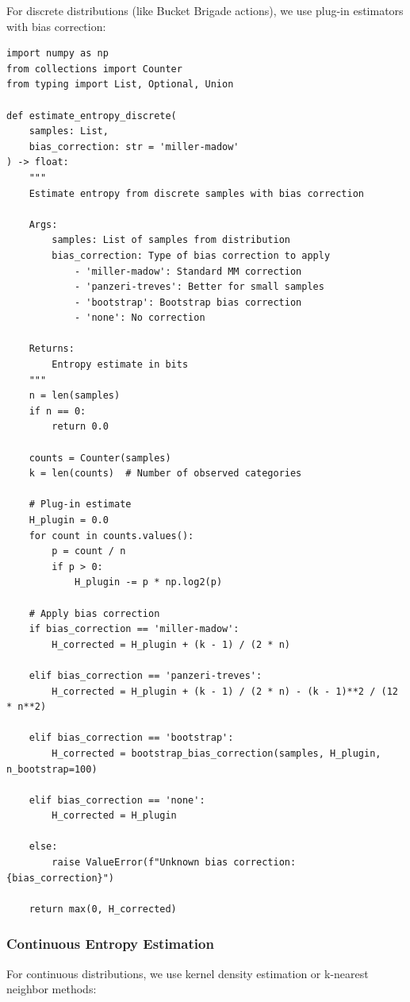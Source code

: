 \documentclass[10pt, letterpaper]{article}
\begin{document}
For discrete distributions (like Bucket Brigade actions), we use plug-in estimators with bias correction:

\begin{lstlisting}
import numpy as np
from collections import Counter
from typing import List, Optional, Union

def estimate_entropy_discrete(
    samples: List,
    bias_correction: str = 'miller-madow'
) -> float:
    """
    Estimate entropy from discrete samples with bias correction

    Args:
        samples: List of samples from distribution
        bias_correction: Type of bias correction to apply
            - 'miller-madow': Standard MM correction
            - 'panzeri-treves': Better for small samples
            - 'bootstrap': Bootstrap bias correction
            - 'none': No correction

    Returns:
        Entropy estimate in bits
    """
    n = len(samples)
    if n == 0:
        return 0.0

    counts = Counter(samples)
    k = len(counts)  # Number of observed categories

    # Plug-in estimate
    H_plugin = 0.0
    for count in counts.values():
        p = count / n
        if p > 0:
            H_plugin -= p * np.log2(p)

    # Apply bias correction
    if bias_correction == 'miller-madow':
        H_corrected = H_plugin + (k - 1) / (2 * n)

    elif bias_correction == 'panzeri-treves':
        H_corrected = H_plugin + (k - 1) / (2 * n) - (k - 1)**2 / (12 * n**2)

    elif bias_correction == 'bootstrap':
        H_corrected = bootstrap_bias_correction(samples, H_plugin, n_bootstrap=100)

    elif bias_correction == 'none':
        H_corrected = H_plugin

    else:
        raise ValueError(f"Unknown bias correction: {bias_correction}")

    return max(0, H_corrected)
\end{lstlisting}

\subsubsection{Continuous Entropy Estimation}

For continuous distributions, we use kernel density estimation or k-nearest neighbor methods:
\end{document}
